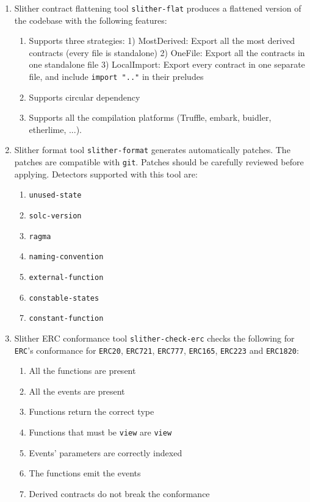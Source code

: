 \begin{enumerate}
\item Slither contract flattening tool \verb|slither-flat| produces a flattened version of the codebase with the following features:
	\begin{enumerate}
	\item Supports three strategies: 1) MostDerived: Export all the most derived contracts (every file is standalone) 2) OneFile: Export all the contracts in one standalone file 3) LocalImport: Export every contract in one separate file, and include \verb|import ".."| in their preludes
	\item Supports circular dependency
	\item Supports all the compilation platforms (Truffle, embark, buidler, etherlime, ...).
	\end{enumerate}

\item Slither format tool \verb|slither-format| generates automatically patches. The patches are compatible with \verb|git|. Patches should be carefully reviewed before applying. Detectors supported with this tool are:
	\begin{enumerate}
	\item\verb|unused-state|
	\item\verb|solc-version|
	\item\verb|ragma|
	\item\verb|naming-convention|
	\item\verb|external-function|
	\item\verb|constable-states|
	\item\verb|constant-function|
	\end{enumerate}

\item Slither ERC conformance tool \verb|slither-check-erc| checks the following for \verb|ERC|'s conformance for \verb|ERC20|, \verb|ERC721|, \verb|ERC777|, \verb|ERC165|, \verb|ERC223| and \verb|ERC1820|:
	\begin{enumerate}
	\item All the functions are present
	\item All the events are present
	\item Functions return the correct type
	\item Functions that must be \verb|view| are \verb|view|
	\item Events' parameters are correctly indexed
	\item The functions emit the events
	\item Derived contracts do not break the conformance
	\end{enumerate}


\end{enumerate}
